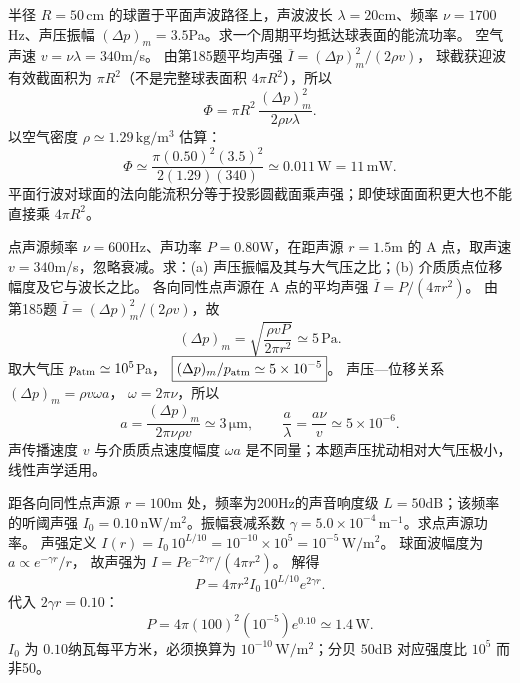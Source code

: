 半径 $R=50\,\mathrm{cm}$ 的球置于平面声波路径上，声波波长 $\lambda=20$cm、频率 $\nu=1700$Hz、声压振幅 $(\Delta p)_m=3.5$Pa。求一个周期平均抵达球表面的能流功率。
\exsolution
空气声速 $v=\nu\lambda=340$m/s。
由第185题平均声强
$\overline I=(\Delta p)_m^2/(2\rho v)$，
球截获迎波有效截面积为 $\pi R^2$（不是完整球表面积 $4\pi R^2$），所以
\[
\boxed{\Phi=\pi R^2\,\frac{(\Delta p)_m^2}{2\rho\nu\lambda}}.
\]
以空气密度 $\rho\simeq1.29\,\mathrm{kg/m^3}$ 估算：
\[
\boxed{\Phi\simeq
\frac{\pi(0.50)^2(3.5)^2}{2(1.29)(340)}
\simeq0.011\,\mathrm W=11\,\mathrm{mW}}.
\]
\excheck 平面行波对球面的法向能流积分等于投影圆截面乘声强；即使球面面积更大也不能直接乘 $4\pi R^2$。

点声源频率 $\nu=600$Hz、声功率 $P=0.80$W，在距声源 $r=1.5$m 的 A 点，取声速 $v=340$m/s，忽略衰减。求：(a) 声压振幅及其与大气压之比；(b) 介质质点位移幅度及它与波长之比。
\exsolution
各向同性点声源在 A 点的平均声强
$\overline I=P/(4\pi r^2)$。
由第185题
$\overline I=(\Delta p)_m^2/(2\rho v)$，故
\[
\boxed{(\Delta p)_m=
\sqrt{\frac{\rho vP}{2\pi r^2}}
\simeq5\,\mathrm{Pa}}.
\]
取大气压 $p_{\rm atm}\simeq10^5$Pa，
$\boxed{(\Delta p)_m/p_{\rm atm}\simeq5\times10^{-5}}$。
声压—位移关系 $(\Delta p)_m=\rho v\omega a$，
$\omega=2\pi\nu$，所以
\[
\boxed{a=\frac{(\Delta p)_m}{2\pi\nu\rho v}
\simeq3\,\mathrm{\mu m}},
\qquad
\boxed{\frac a\lambda=\frac{a\nu}{v}
\simeq5\times10^{-6}}.
\]
\excheck 声传播速度 $v$ 与介质质点速度幅度 $\omega a$ 是不同量；本题声压扰动相对大气压极小，线性声学适用。

距各向同性点声源 $r=100$m 处，频率为200Hz的声音响度级 $L=50$dB；该频率的听阈声强 $I_0=0.10\,\mathrm{nW/m^2}$。振幅衰减系数 $\gamma=5.0\times10^{-4}\,\mathrm{m^{-1}}$。求点声源功率。
\exsolution
声强定义
$I(r)=I_0\,10^{L/10}
=10^{-10}\times10^5=10^{-5}\,\mathrm{W/m^2}$。
球面波幅度为 $a\propto e^{-\gamma r}/r$，
故声强为 $I=P e^{-2\gamma r}/(4\pi r^2)$。
解得
\[
\boxed{P=4\pi r^2 I_0\,10^{L/10}e^{2\gamma r}}.
\]
代入 $2\gamma r=0.10$：
\[
\boxed{P=4\pi(100)^2(10^{-5})e^{0.10}
\simeq1.4\,\mathrm W}.
\]
\excheck $I_0$ 为 $0.10$纳瓦每平方米，必须换算为 $10^{-10}\,\mathrm{W/m^2}$；分贝 $50$dB 对应强度比 $10^5$ 而非50。
